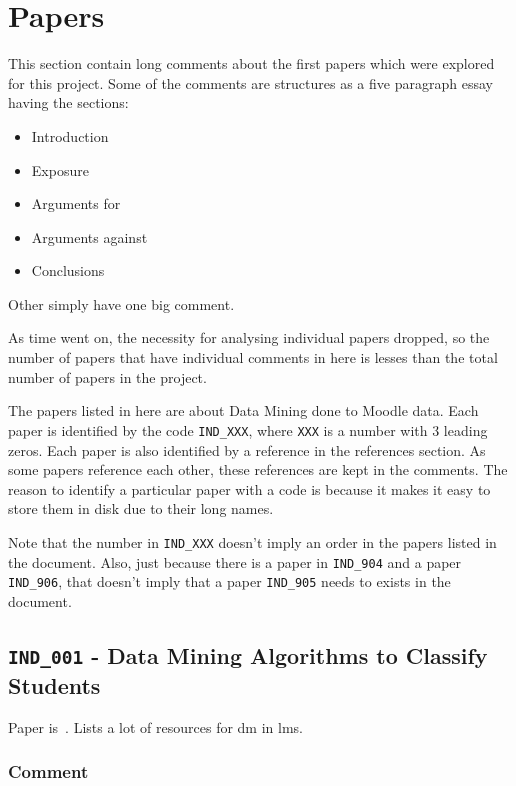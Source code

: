 \section{Papers}

This section contain long comments about the first papers which were explored
for this project. Some of the comments are structures as a five paragraph essay
having the sections:

\begin{itemize}
    \item Introduction
    \item Exposure
    \item Arguments for
    \item Arguments against
    \item Conclusions
\end{itemize}

Other simply have one big comment.

As time went on, the necessity for analysing individual papers dropped, so the
number of papers that have individual comments in here is lesses than the total
number of papers in the project.

The papers listed in here are about Data Mining done to Moodle data. Each paper
is identified by the code \texttt{IND\_XXX}, where \texttt{XXX} is a number
with 3 leading zeros. Each paper is also identified by a reference in the
references section. As some papers reference each other, these references are
kept in the comments. The reason to identify a particular paper with a code is
because it makes it easy to store them in disk due to their long names.

Note that the number in \texttt{IND\_XXX} doesn't imply an order in the papers
listed in the document. Also, just because there is a paper in
\texttt{IND\_904} and a paper \texttt{IND\_906}, that doesn't imply that a
paper \texttt{IND\_905} needs to exists in the document.

\subsection{\texttt{IND\_001} - Data Mining Algorithms to Classify Students}

Paper is~\cite{ind_001}. Lists a lot of resources for \gls{dm} in \gls{lms}.

\subsubsection{Comment}

